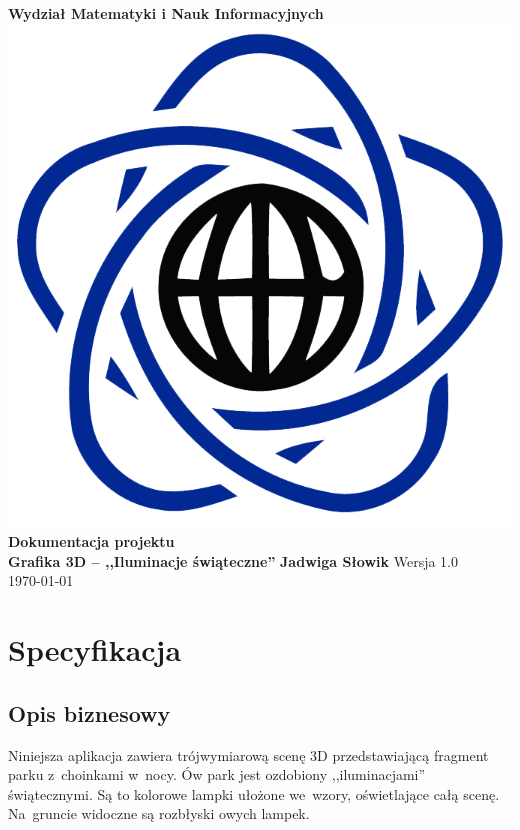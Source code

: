 \documentclass[11pt, a4paper, oneside]{scrartcl}
\begin{document}
\begin{titlepage}

\centering
    \vfill
    {\bfseries\Large
        Wydział Matematyki i Nauk Informacyjnych
    }    
    \vfill
	\includegraphics[scale=0.2]{logo_mini.png}
	\vfill
	{\bfseries\Large
        Dokumentacja projektu \\
	Grafika 3D -- ,,Iluminacje świąteczne''
    } 
\vfill
	{
	\textbf{Jadwiga Słowik}
	}
 \vfill
{
     Wersja 1.0 \\ 
     \today
}
\end{titlepage}

\tableofcontents
\newpage

\section{Specyfikacja}
\subsection{Opis biznesowy}
Niniejsza aplikacja zawiera trójwymiarową scenę 3D przedstawiającą fragment parku z~choinkami w~nocy.
Ów park jest ozdobiony ,,iluminacjami'' świątecznymi. Są to kolorowe lampki ułożone we~wzory, oświetlające całą scenę.
Na~gruncie widoczne są rozbłyski owych lampek. 
\end{document}
